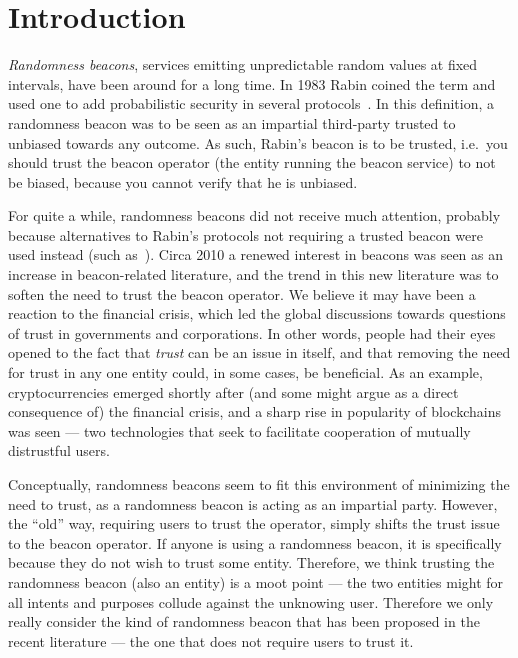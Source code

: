 \section{Introduction}

\emph{Randomness beacons}, services emitting unpredictable random values at fixed intervals, have been around for a long time.
In 1983 Rabin coined the term and used one to add probabilistic security in several protocols~\cite{rabin1983transaction}.
In this definition, a randomness beacon was to be seen as an impartial third-party trusted to unbiased towards any outcome.
As such, Rabin's beacon is to be trusted, i.e.\ you should trust the beacon operator (the entity running the beacon service) to not be biased, because you cannot verify that he is unbiased.

For quite a while, randomness beacons did not receive much attention, probably because alternatives to Rabin's protocols not requiring a trusted beacon were used instead (such as~\cite{BGMR}).
Circa 2010 a renewed interest in beacons was seen as an increase in beacon-related literature, and the trend in this new literature was to soften the need to trust the beacon operator.
We believe it may have been a reaction to the financial crisis, which led the global discussions towards questions of trust in governments and corporations.
In other words, people had their eyes opened to the fact that \emph{trust} can be an issue in itself, and that removing the need for trust in any one entity could, in some cases, be beneficial.
As an example, cryptocurrencies emerged shortly after (and some might argue as a direct consequence of) the financial crisis, and a sharp rise in popularity of blockchains was seen --- two technologies that seek to facilitate cooperation of mutually distrustful users.

Conceptually, randomness beacons seem to fit this environment of minimizing the need to trust, as a randomness beacon is acting as an impartial party. However, the \enquote{old} way, requiring users to trust the operator, simply shifts the trust issue to the beacon operator.
If anyone is using a randomness beacon, it is specifically because they do not wish to trust some entity. Therefore, we think trusting the randomness beacon (also an entity) is a moot point --- the two entities might for all intents and purposes collude against the unknowing user.
Therefore we only really consider the kind of randomness beacon that has been proposed in the recent literature --- the one that does not require users to trust it.

